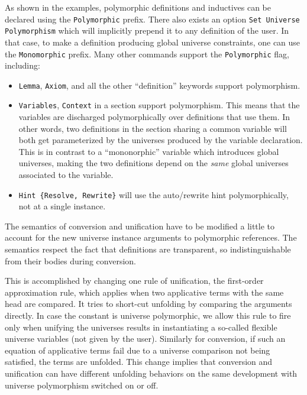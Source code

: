
As shown in the examples, polymorphic definitions and inductives can be
declared using the \texttt{Polymorphic} prefix. There also exists an
option \texttt{Set Universe Polymorphism} which will implicitly prepend
it to any definition of the user. In that case, to make a definition
producing global universe constraints, one can use the
\texttt{Monomorphic} prefix. Many other commands support the
\texttt{Polymorphic} flag, including:

\begin{itemize}
\item \texttt{Lemma}, \texttt{Axiom}, and all the other ``definition''
  keywords support polymorphism.
\item \texttt{Variables}, \texttt{Context} in a section support polymorphism.
  This means that the
  variables are discharged polymorphically over definitions that use
  them. In other words, two definitions in the section sharing a common
  variable will both get parameterized by the universes produced by the 
  variable declaration. This is in contrast to a ``mononorphic'' variable
  which introduces global universes, making the two definitions depend on
  the \emph{same} global universes associated to the variable.
\item \texttt{Hint \{Resolve, Rewrite\}} will use the auto/rewrite hint
  polymorphically, not at a single instance.
\end{itemize}


The semantics of conversion and unification have to be modified a little
to account for the new universe instance arguments to polymorphic
references. The semantics respect the fact that definitions are
transparent, so indistinguishable from their bodies during conversion.

This is accomplished by changing one rule of unification, the
first-order approximation rule, which applies when two applicative terms
with the same head are compared. It tries to short-cut unfolding by
comparing the arguments directly. In case the constant is universe
polymorphic, we allow this rule to fire only when unifying the universes
results in instantiating a so-called flexible universe variables (not
given by the user). Similarly for conversion, if such an equation of
applicative terms fail due to a universe comparison not being satisfied,
the terms are unfolded. This change implies that conversion and
unification can have different unfolding behaviors on the same
development with universe polymorphism switched on or off.

